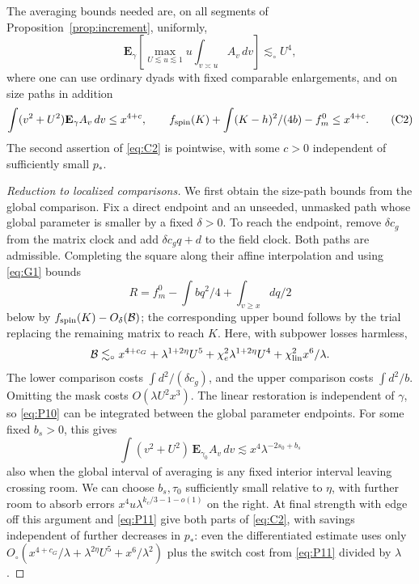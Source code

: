 \begin{proposition}\label{bud:targets}

The averaging bounds needed are, on all segments of Proposition~\ref{prop:increment}, uniformly,
\[
 \mathbf E_\gamma\left[\max_{U\lesssim u\lesssim1}
       u\int_{v\asymp u} A_v\,dv\right]\lesssim_\circ U^4,              \tag{C1}\label{eq:C1}
\]
where one can use ordinary dyads with fixed comparable enlargements, and on size paths in addition
\[
 \int (v^2+U^2)\mathbf E_\gamma A_v\,dv \le x^{4+c},\qquad
 f_{\rm spin}(K)+\int (K-h)^2/(4b)- f_m^0 \le x^{4+c}.                  \tag{C2}\label{eq:C2}
\]
The second assertion of \eqref{eq:C2} is pointwise, with some \(c>0\) independent of sufficiently small \(p_*\).

\end{proposition}\begin{proof}[Reduction to localized comparisons]


We first obtain the size-path bounds from the global comparison. Fix a
direct endpoint and an unseeded, unmasked path whose global parameter
is smaller by a fixed \(\delta>0\). To reach the endpoint, remove
\(\delta c_g\) from the matrix clock and add \(\delta c_gq+d\) to
the field clock. Both paths are admissible. Completing the square
along their affine interpolation and using \eqref{eq:G1} bounds
\[
 R=f_m^0-\int bq^2/4+\int_{v\ge x}d q/2
\]
below by \(f_{\rm spin}(K)-O_\delta({\cal B})\); the corresponding upper bound follows by the trial replacing the remaining matrix to reach \(K\). Here, with subpower losses harmless,
\[
 {\cal B}\lesssim_\circ x^{4+c_G}+
       \lambda^{1+2\eta}U^5+\chi_e^2\lambda^{1+2\eta}U^4+\chi_{\rm lin}^2 x^6/\lambda.
\]
The lower comparison costs \(\int d^2/(\delta c_g)\), and the upper
comparison costs \(\int d^2/b\). Omitting the mask costs
\(O(\lambda U^2x^3)\). The linear restoration is independent of
\(\gamma\), so \eqref{eq:P10} can be integrated between the global
parameter endpoints. For some fixed \(b_s>0\), this gives
\[
 \int(v^2+U^2)\,\mathbf E_{\gamma_0} A_v\,dv
       \lesssim x^4\lambda^{-2s_0+b_s}
\]
also when the global interval of averaging is any fixed interior interval leaving crossing room. We can choose \(b_s,\tau_0\) sufficiently small relative to \(\eta\), with further room to absorb errors \(x^4u\lambda^{k_c/3-1-o(1)}\) on the right. At final strength with edge off this argument and \eqref{eq:P11} give both parts of \eqref{eq:C2}, with savings independent of further decreases in \(p_*\): even the differentiated estimate uses only \(O_\circ(x^{4+c_G}/\lambda+\lambda^{2\eta}U^5+x^6/\lambda^2)\) plus the switch cost from \eqref{eq:P11} divided by \(\lambda\).


\end{proof}

